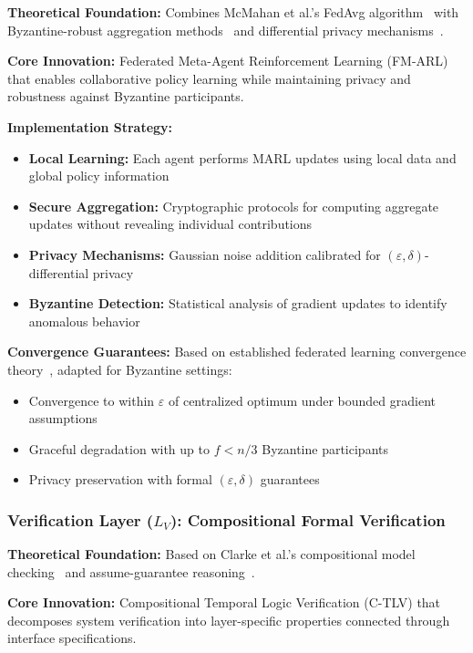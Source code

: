 \documentclass[conference]{IEEEtran}
\newcommand{\epsilon}{\varepsilon}
\begin{document}
\textbf{Theoretical Foundation:} Combines McMahan et al.'s FedAvg algorithm~\cite{mcmahan2017federated} with Byzantine-robust aggregation methods~\cite{blanchard2017machine} and differential privacy mechanisms~\cite{abadi2016deep}.

\textbf{Core Innovation:} Federated Meta-Agent Reinforcement Learning (FM-ARL) that enables collaborative policy learning while maintaining privacy and robustness against Byzantine participants.

\textbf{Implementation Strategy:}
\begin{itemize}
    \item \textbf{Local Learning:} Each agent performs MARL updates using local data and global policy information
    \item \textbf{Secure Aggregation:} Cryptographic protocols for computing aggregate updates without revealing individual contributions
    \item \textbf{Privacy Mechanisms:} Gaussian noise addition calibrated for $(\varepsilon, \delta)$-differential privacy~\cite{dwork2014algorithmic}
    \item \textbf{Byzantine Detection:} Statistical analysis of gradient updates to identify anomalous behavior
\end{itemize}

\textbf{Convergence Guarantees:} Based on established federated learning convergence theory~\cite{li2020federated}, adapted for Byzantine settings:
\begin{itemize}
    \item Convergence to within $\epsilon$ of centralized optimum under bounded gradient assumptions
    \item Graceful degradation with up to $f < n/3$ Byzantine participants
    \item Privacy preservation with formal $(\varepsilon, \delta)$ guarantees
\end{itemize}

\subsubsection{Verification Layer ($L_V$): Compositional Formal Verification}

\textbf{Theoretical Foundation:} Based on Clarke et al.'s compositional model checking~\cite{clarke1989compositional} and assume-guarantee reasoning~\cite{jones1983tentative}.

\textbf{Core Innovation:} Compositional Temporal Logic Verification (C-TLV) that decomposes system verification into layer-specific properties connected through interface specifications.
\end{document}
